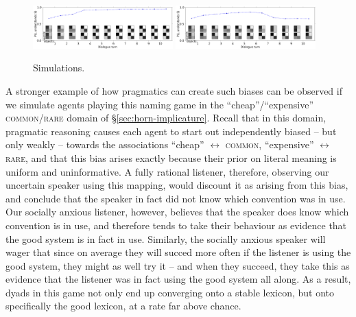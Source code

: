 \documentclass{article} %
\begin{document}
\begin{figure}[t]
\centering
\includegraphics[width=0.48\textwidth]{figures/horn-emergence-0.pdf}
\includegraphics[width=0.48\textwidth]{figures/horn-emergence-1.pdf}
\caption{\label{fig:horn} Simulations.}
\end{figure}

A stronger example of how pragmatics can create such biases can be observed if we simulate agents playing this naming game in the ``cheap''/``expensive'' \textsc{common}/\textsc{rare} domain of \S\ref{sec:horn-implicature}. Recall that in this domain, pragmatic reasoning causes each agent to start out independently biased -- but only weakly -- towards the associations ``cheap'' $\leftrightarrow$ \textsc{common}, ``expensive'' $\leftrightarrow$ \textsc{rare}, and that this bias arises exactly because their prior on literal meaning is uniform and uninformative. A fully rational listener, therefore, observing our uncertain speaker using this mapping, would discount it as arising from this bias, and conclude that the speaker in fact did not know which convention was in use. Our socially anxious listener, however, believes that the speaker does know which convention is in use, and therefore tends to take their behaviour as evidence that the good system is in fact in use. Similarly, the socially anxious speaker will wager that since on average they will succed more often if the listener is using the good system, they might as well try it -- and when they succeed, they take this as evidence that the listener was in fact using the good system all along. As a result, dyads in this game not only end up converging onto a stable lexicon, but onto specifically the good lexicon, at a rate far above chance.



%
\end{document}
